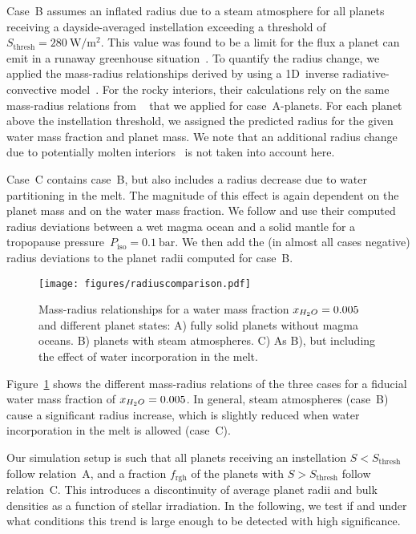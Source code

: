 \documentclass[modern]{aastex631}
\begin{document}
Case~B assumes an inflated radius due to a steam atmosphere for all planets receiving a dayside-averaged instellation exceeding a threshold of $S_\mathrm{thresh} = \SI{280}{\watt\per\meter\squared}$.
This value was found to be a limit for the flux a planet can emit in a runaway greenhouse situation~\citep{Goldblatt2013,Leconte2013}.
To quantify the radius change, we applied the mass-radius relationships derived by \citet{Turbet2020} using a 1D~inverse radiative-convective model~\citep{Turbet2019}.
For the rocky interiors, their calculations rely on the same mass-radius relations from ~\citep{Zeng2016} that we applied for case~A-planets.
For each planet above the instellation threshold, we assigned the predicted radius for the given water mass fraction and planet mass.
We note that an additional radius change due to potentially molten interiors~\citep{Bower2019} is not taken into account here.

Case~C contains case~B, but also includes a radius decrease due to water partitioning in the melt.
The magnitude of this effect is again dependent on the planet mass and on the water mass fraction.
We follow \citet{Dorn2021} and use their computed radius deviations between a wet magma ocean and a solid mantle for a tropopause pressure~$P_\mathrm{iso}=\SI{0.1}{\bar}$.
We then add the (in almost all cases negative) radius deviations to the planet radii computed for case~B.

\begin{figure}
    \begin{centering}
        \texttt{[image: figures/radiuscomparison.pdf]}
        \caption{Mass-radius relationships for a water mass fraction $x_{H_2O}= 0.005$ and different planet states: A) fully solid planets without magma oceans. B) planets with steam atmospheres. C) As B), but including the effect of water incorporation in the melt.}
        \label{fig:radiuscomparison}
    \end{centering}
\end{figure}

Figure~\ref{fig:radiuscomparison} shows the different mass-radius relations of the three cases for a fiducial water mass fraction of $x_{H_2O}= 0.005$.
In general, steam atmospheres (case~B) cause a significant radius increase, which is slightly reduced when water incorporation in the melt is allowed (case~C).

Our simulation setup is such that all planets receiving an instellation $S < S_\mathrm{thresh}$ follow relation~A, and a fraction $f_\mathrm{rgh}$ of the planets with $S > S_\mathrm{thresh}$ follow relation~C.
This introduces a discontinuity of average planet radii and bulk densities as a function of stellar irradiation.
In the following, we test if and under what conditions this trend is large enough to be detected with high significance.
\end{document}
